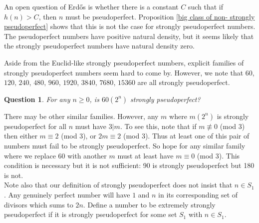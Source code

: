 \documentclass{article}
\newtheorem{proposition}[theorem]{Proposition}
\newtheorem{question}[theorem]{Question}
\begin{document}


An open question of Erd\H{o}s \cite{Benkoski and Erdos} is whether there is a constant $C$ such that if $h(n) > C$, then $n$ must be pseudoperfect. Proposition \ref{big class of non- strongly pseudoperfect} shows that this is not the case for strongly pseudoperfect numbers. The pseudoperfect numbers have positive natural density, but it seems likely that the strongly pseudoperfect numbers have natural density zero.

Aside from the Euclid-like strongly pseudoperfect numbers, explicit families of strongly pseudoperfect numbers seem hard to come by. However, we note that $60$, $120$, $240$, $480$, $960$, $1920$, $3840$, $7680$, $15360$ are all strongly pseudoperfect.  

\begin{question} For any $n \geq 0$, is $60(2^n)$ strongly pseudoperfect?
\end{question} 

There may be other similar families. However, any $m$ where $m(2^n)$ is strongly pseudoperfect for all $n$ must have $3|m$. To see this, note that  if $m \not \equiv 0$ (mod 3) then either $m \equiv 2$ (mod 3), or $2m \equiv 2$ (mod 3). Thus at least one of this pair of numbers must fail to be strongly pseudoperfect. So hope for any similar family where we replace $60$ with another $m$ must at least have $m \equiv 0$ (mod 3). This condition is necessary but it is not sufficient: 90 is strongly pseudoperfect but 180 is not.\\

Note also that our definition of strongly pseudoperfect does not insist that $n \in S_1$. Any genuinely perfect number will have $1$ and $n$ in its corresponding set of divisors which sums to $2n$. Define a number to be extremely strongly pseudoperfect if it is strongly pseudoperfect for some set $S_1$ with $n \in S_1$. 
\end{document}

